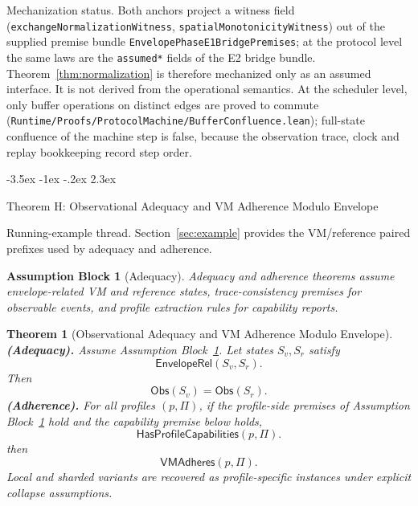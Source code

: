 \documentclass[a4paper,10pt,twocolumn,english]{article}
\makeatletter
\renewcommand{\section}{\@startsection{section}{1}{\z@}%
  {-3.5ex \@plus -1ex \@minus -.2ex}%
  {2.3ex}%
  {\raggedright\normalfont\large\bfseries}}
\numberwithin{equation}{section}
\theoremstyle{paperdef}
\theoremstyle{paperplain}
\newtheorem{theorem}[definition]{Theorem}
\theoremstyle{paperdef}
\theoremstyle{paperremark}
\theoremstyle{paperdef}
\newtheorem{assumptions}[assumption]{Assumption Block}
\newcommand{\EnvelopeRel}{\ensuremath{\mathsf{EnvelopeRel}}}
\newcommand{\Obs}{\ensuremath{\mathsf{Obs}}}
\newcommand{\VMAdheres}{\ensuremath{\mathsf{VMAdheres}}}
\newcommand{\HasProfileCapabilities}{\ensuremath{\mathsf{HasProfileCapabilities}}}
\makeatother
\begin{document}
Mechanization status. Both anchors project a witness field
(\texttt{exchangeNormalizationWitness}, \texttt{spatialMonotonicityWitness}) out of
the supplied premise bundle \texttt{EnvelopePhaseE1BridgePremises}; at the
protocol level the same laws are the \texttt{assumed*} fields of the E2 bridge
bundle. Theorem~\ref{thm:normalization} is therefore mechanized only as an
assumed interface. It is not derived from the operational semantics. At the scheduler level,
only buffer operations on distinct edges are proved to commute
(\texttt{Runtime/\allowbreak Proofs/\allowbreak ProtocolMachine/\allowbreak BufferConfluence.lean});
full-state confluence of the machine step is false, because the observation
trace, clock and replay bookkeeping record step order.

\section{Theorem H: Observational Adequacy and VM Adherence Modulo Envelope}
\label{sec:theorem-h}

Running-example thread. Section~\ref{sec:example} provides the VM/reference
paired prefixes used by adequacy and adherence.

\begin{assumptions}[Adequacy]
	\label{assump:p3-adequacy}
	Adequacy and adherence theorems assume envelope-related VM and reference states, trace-consistency premises for observable events, and profile extraction rules for capability reports.
\end{assumptions}

\begin{theorem}[Observational Adequacy and VM Adherence Modulo Envelope]
	\label{thm:adequacy}
	\textbf{(Adequacy).} Assume Assumption Block~\ref{assump:p3-adequacy}.
	Let states $S_v,S_r$ satisfy
	\begin{equation}
		\EnvelopeRel(S_v,S_r).
	\end{equation}
	Then
	\begin{equation}
		\Obs(S_v) = \Obs(S_r).
	\end{equation}
	\textbf{(Adherence).} For all profiles $(p,\Pi)$, if the profile-side premises of Assumption Block~\ref{assump:p3-adequacy} hold and the capability premise below holds,
	\begin{equation}
		\HasProfileCapabilities(p,\Pi).
	\end{equation}
	then
	\begin{equation}
		\VMAdheres(p,\Pi).
	\end{equation}
	Local and sharded variants are recovered as profile-specific instances under explicit collapse assumptions.
\end{theorem}
\end{document}
